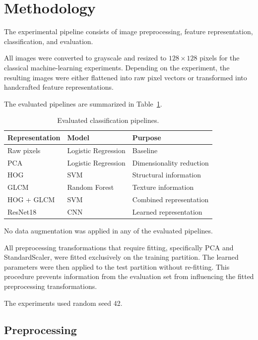 \documentclass[11pt,a4paper]{article}
\begin{document}
\section{Methodology}

The experimental pipeline consists of image preprocessing, feature representation, classification, and evaluation.

All images were converted to grayscale and resized to $128 \times 128$ pixels for the classical machine-learning experiments. Depending on the experiment, the resulting images were either flattened into raw pixel vectors or transformed into handcrafted feature representations.

The evaluated pipelines are summarized in Table~\ref{tab:pipelines}.

\begin{table}[H]
\centering
\caption{Evaluated classification pipelines.}
\label{tab:pipelines}
\begin{tabular}{lll}
\toprule
\textbf{Representation} & \textbf{Model} & \textbf{Purpose} \\
\midrule
Raw pixels & Logistic Regression & Baseline \\
PCA & Logistic Regression & Dimensionality reduction \\
HOG & SVM & Structural information \\
GLCM & Random Forest & Texture information \\
HOG + GLCM & SVM & Combined representation \\
ResNet18 & CNN & Learned representation \\
\bottomrule
\end{tabular}
\end{table}

No data augmentation was applied in any of the evaluated pipelines.

All preprocessing transformations that require fitting, specifically PCA and StandardScaler, were fitted exclusively on the training partition. The learned parameters were then applied to the test partition without re-fitting. This procedure prevents information from the evaluation set from influencing the fitted preprocessing transformations.

The experiments used random seed 42.

\subsection{Preprocessing}
\end{document}
